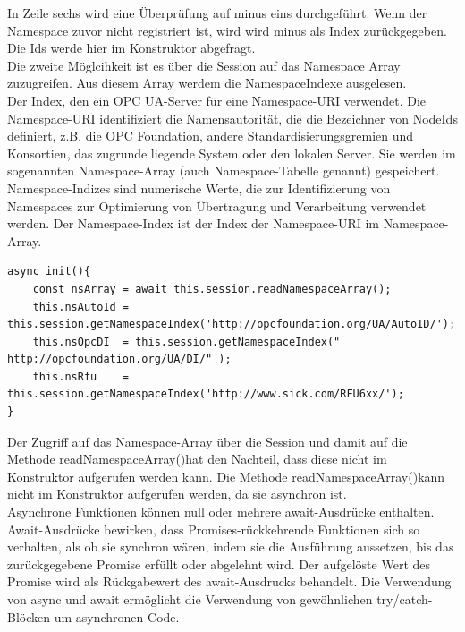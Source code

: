In Zeile sechs wird eine Überprüfung auf minus eins durchgeführt. Wenn der Namespace zuvor nicht registriert ist, wird wird minus als Index zurückgegeben. Die Ids werde hier im Konstruktor abgefragt.\\

Die zweite Möglcihkeit ist es über die Session auf das Namespace Array zuzugreifen. Aus diesem Array werdem die NamespaceIndexe ausgelesen.\\

Der Index, den ein OPC UA-Server für eine Namespace-URI verwendet. Die Namespace-URI identifiziert die Namensautorität, die die Bezeichner von NodeIds definiert, z.B. die OPC Foundation, andere Standardisierungsgremien und Konsortien, das zugrunde liegende System oder den lokalen Server. Sie werden im sogenannten Namespace-Array (auch Namespace-Tabelle genannt) gespeichert. Namespace-Indizes sind numerische Werte, die zur Identifizierung von Namespaces zur Optimierung von Übertragung und Verarbeitung verwendet werden. Der Namespace-Index ist der Index der Namespace-URI im Namespace-Array.\\

\begin{lstlisting}[style=JavaScript, caption={Zugriff auf die Ids über die Session}]
async init(){		
    const nsArray = await this.session.readNamespaceArray();
    this.nsAutoId = this.session.getNamespaceIndex('http://opcfoundation.org/UA/AutoID/');
    this.nsOpcDI  = this.session.getNamespaceIndex(" http://opcfoundation.org/UA/DI/" );
    this.nsRfu    = this.session.getNamespaceIndex('http://www.sick.com/RFU6xx/');
}
\end{lstlisting}

Der Zugriff auf das Namespace-Array über die Session und damit auf die Methode \frqq readNamespaceArray()\flqq   hat den Nachteil, dass diese nicht im Konstruktor aufgerufen werden kann. Die Methode \frqq readNamespaceArray()\flqq   kann nicht im Konstruktor aufgerufen werden, da sie asynchron ist.\\

Asynchrone Funktionen können null oder mehrere await-Ausdrücke enthalten. Await-Ausdrücke bewirken, dass Promises-rückkehrende Funktionen sich so verhalten, als ob sie synchron wären, indem sie die Ausführung aussetzen, bis das zurückgegebene Promise erfüllt oder abgelehnt wird. Der aufgelöste Wert des Promise wird als Rückgabewert des await-Ausdrucks behandelt. Die Verwendung von async und await ermöglicht die Verwendung von gewöhnlichen try/catch-Blöcken um asynchronen Code.\\

